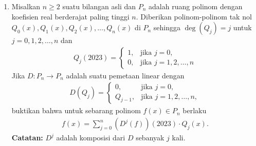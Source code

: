 \documentclass[12pt,twoside]{article}
\begin{document}
\begin{enumerate}
\begin{enumerate}
          \end{enumerate}
    \item Misalkan $n\geq 2$ suatu bilangan asli dan $P_n$ adalah ruang polinom dengan koefisien real berderajat paling tinggi $n$. Diberikan polinom-polinom tak nol $Q_0(x),Q_1(x),Q_2(x),\dots,Q_n(x)$ di $P_n$ sehingga $\deg (Q_j)=j$ untuk $j=0,1,2,\dots,n$ dan
          \begin{align*}
              Q_j(2023)=\begin{cases}
                            1, & \text{jika } j=0,          \\
                            0, & \text{jika } j=1,2,\dots,n
                        \end{cases}
          \end{align*}
          Jika $D:P_n\to P_n$ adalah suatu pemetaan linear dengan
          \begin{align*}
              D(Q_j)=\begin{cases}
                         0,       & \text{jika } j=0,           \\
                         Q_{j-1}, & \text{jika } j=1,2,\dots,n,
                     \end{cases}
          \end{align*}
          buktikan bahwa untuk sebarang polinom $f(x)\in P_n$ berlaku
          \begin{align*}
              f(x)=\sum_{j=0}^n (D^j(f))(2023)\cdot Q_j(x).
          \end{align*}
          \textbf{Catatan:} $D^j$ adalah komposisi dari $D$ sebanyak $j$ kali.
\end{enumerate}
\pagebreak
\end{document}
